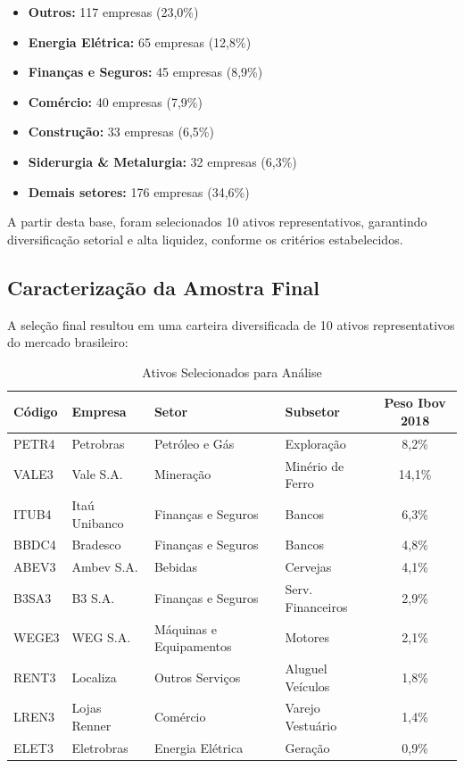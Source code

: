 \begin{itemize}
    \item \textbf{Outros:} 117 empresas (23,0\%)
    \item \textbf{Energia Elétrica:} 65 empresas (12,8\%)
    \item \textbf{Finanças e Seguros:} 45 empresas (8,9\%)
    \item \textbf{Comércio:} 40 empresas (7,9\%)
    \item \textbf{Construção:} 33 empresas (6,5\%)
    \item \textbf{Siderurgia \& Metalurgia:} 32 empresas (6,3\%)
    \item \textbf{Demais setores:} 176 empresas (34,6\%)
\end{itemize}

A partir desta base, foram selecionados 10 ativos representativos, garantindo diversificação setorial e alta liquidez, conforme os critérios estabelecidos.

\subsection{Caracterização da Amostra Final}

A seleção final resultou em uma carteira diversificada de 10 ativos representativos do mercado brasileiro:

\begin{table}[H]
\centering
\caption{Ativos Selecionados para Análise}
\begin{tabular}{llllc}
\toprule
\textbf{Código} & \textbf{Empresa} & \textbf{Setor} & \textbf{Subsetor} & \textbf{Peso Ibov 2018} \\
\midrule
PETR4 & Petrobras & Petróleo e Gás & Exploração & 8,2\% \\
VALE3 & Vale S.A. & Mineração & Minério de Ferro & 14,1\% \\
ITUB4 & Itaú Unibanco & Finanças e Seguros & Bancos & 6,3\% \\
BBDC4 & Bradesco & Finanças e Seguros & Bancos & 4,8\% \\
ABEV3 & Ambev S.A. & Bebidas & Cervejas & 4,1\% \\
B3SA3 & B3 S.A. & Finanças e Seguros & Serv. Financeiros & 2,9\% \\
WEGE3 & WEG S.A. & Máquinas e Equipamentos & Motores & 2,1\% \\
RENT3 & Localiza & Outros Serviços & Aluguel Veículos & 1,8\% \\
LREN3 & Lojas Renner & Comércio & Varejo Vestuário & 1,4\% \\
ELET3 & Eletrobras & Energia Elétrica & Geração & 0,9\% \\
\bottomrule
\end{tabular}
\label{tab:ativos_selecionados}
\end{table}

